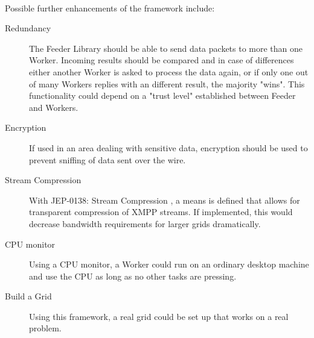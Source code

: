 \paragraph{}
Possible further enhancements of the framework include:
\begin{description}
\item[Redundancy] The Feeder Library should be able to send data packets to more than one Worker. Incoming results should be compared and in case of differences either another Worker is asked to process the data again, or if only one out of many Workers replies with an different result, the majority "wins". This functionality could depend on a "trust level" established between Feeder and Workers.
\item[Encryption] If used in an area dealing with sensitive data, encryption should be used to prevent sniffing of data sent over the wire.
\item[Stream Compression] With JEP-0138: Stream Compression \cite{jep0138}, a means is defined that allows for transparent compression of XMPP streams. If implemented, this would decrease bandwidth requirements for larger grids dramatically.
\item[CPU monitor] Using a CPU monitor, a Worker could run on an ordinary desktop machine and use the CPU as long as no other tasks are pressing.
\item[Build a Grid] Using this framework, a real grid could be set up that works on a real problem.
\end{description}
